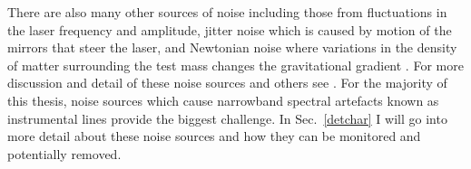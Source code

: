 There are also many other sources of noise including those from fluctuations in the
laser frequency and amplitude, jitter noise which is caused by motion of the
mirrors that steer the laser, and Newtonian noise where variations in the
density of matter surrounding the test mass changes the gravitational gradient
\citep{martynov2016SensitivityAdvanced}.  For more discussion and detail of
these noise sources and others see
\citep{martynov2016SensitivityAdvanced,aasi2015AdvancedLIGO,aasi2015CharacterizationLIGO}.
For the majority of this thesis, noise sources which cause narrowband spectral
artefacts known as instrumental lines provide the biggest challenge.  In
Sec.~\ref{detchar} I will go into more detail about these noise sources and how
they can be monitored and potentially removed.













